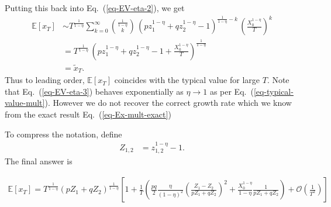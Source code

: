 \documentclass[11pt]{article}
\begin{document}
Putting this back into Eq.~(\ref{eq-EV-eta-2}), we get
\begin{align}
\nonumber \mathbb{E}\left[x_T \right] &\sim T^\frac{1}{1-\eta}   \sum_{k=0}^\infty {\frac{1}{1-\eta} \choose k}   \,\left( p z_1^{1-\eta} + q z_2^{1-\eta} -1\right)^{\frac{1}{1-\eta}-k}\,\left(\frac{X_0^{1-\eta}}{T}\right)^k \\
\label{eq-EV-eta-3} &=  T^\frac{1}{1-\eta} \, \left( p z_1^{1-\eta} + q z_2^{1-\eta} -1 + \frac{X_0^{1-\eta}}{T}\right)^\frac{1}{1-\eta} \\
\nonumber &= \widetilde{x}_T.
\end{align}
Thus to leading order, $ \mathbb{E}\left[x_T \right] $ coincides with the typical value for large $T$. Note that Eq.~(\ref{eq-EV-eta-3}) behaves exponentially as $\eta \to 1$ as per Eq.~(\ref{eq-typical-value-mult}). However we do not recover the correct growth rate which we know from the exact result Eq.~(\ref{eq-Ex-mult-exact})

To compress the notation, define
\begin{align*}
Z_{1,2} &= z_{1,2}^{1-\eta}-1.
\end{align*}
The final answer is

\begin{align*}
\mathbb{E}\left[x_T\right] = T^\frac{1}{1-\eta} \left( p Z_1 + q Z_2\right)^\frac{1}{1-\eta} \left[ 1+  
\frac{1}{T}\left( \frac{p q}{2}\frac{\eta}{(1-\eta)^2}\left(\frac{Z_1-Z_2}{pZ_1+q Z_2}\right)^2 + \frac{X_0^{1-\eta}}{1-\eta} \frac{1}{p Z_1+q Z_2}\right)
+ \mathcal{O}\left(\frac{1}{T^2}\right) \right]
\end{align*}



\end{document}
